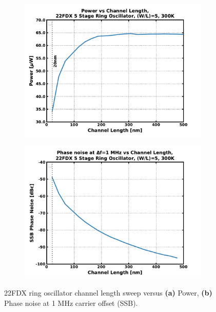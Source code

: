 		\begin{figure}[htb!]
		    \centering
		    \begin{subfigure}{0.5\textwidth}
		        \centering
		        \includegraphics[width=1\textwidth, angle=0]{./figs/design/22fdx_rosc_power}
		        \caption{ }
		        \label{fig:rosc_power}
		    \end{subfigure}%
		    \begin{subfigure}{0.5\textwidth}
		        \centering
		        \includegraphics[width=1\textwidth, angle=0]{./figs/design/22fdx_rosc_pn_1mhz}
		        \caption{ }
		        \label{fig:rosc_pn_1m}
		    \end{subfigure}
		    \label{fig:rosc_groupb}
		    \caption{22FDX ring oscillator channel length sweep versus \textbf{(a)} Power, \textbf{(b)} Phase noise at 1 MHz carrier offset (SSB).}
		\end{figure} 

